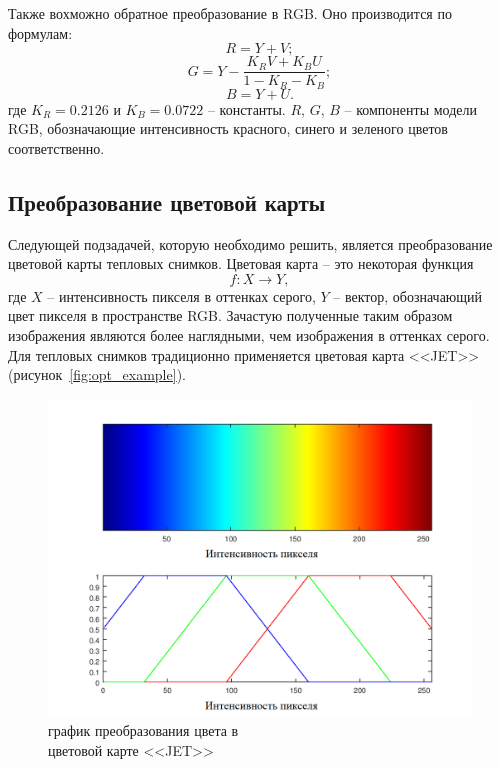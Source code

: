 \documentclass[14pt, a4paper]{extreport}
\begin{document}
	Также вохможно обратное преобразование в RGB. Оно производится по формулам:
	\begin{equation}
		R = Y + V;
		\label{eq:R_in_YUV}
	\end{equation}
	\begin{equation}
		G = Y - \frac{K_R V + K_B U}{1 - K_R - K_B};
		\label{eq:G_in_YUV}
	\end{equation}
	\begin{equation}
	B = Y + U.
		\label{eq:B_in_YUV}
	\end{equation}
	где $K_R = 0.2126$ и $K_B = 0.0722$ -- константы. $R$, $G$, $B$ -- компоненты модели RGB, обозначающие интенсивность красного, синего и зеленого цветов соответственно.

\subsection{Преобразование цветовой карты}
	
	Следующей подзадачей, которую необходимо решить, является преобразование цветовой карты тепловых снимков. Цветовая карта -- это некоторая функция
	\begin{equation}
		f: X \rightarrow Y,
		\label{eq:fXY}
	\end{equation}
	 где $X$ -- интенсивность пикселя в оттенках серого, $Y$ -- вектор, обозначающий цвет пикселя в пространстве RGB. Зачастую полученные таким образом изображения являются более наглядными, чем изображения в оттенках серого. Для тепловых снимков традиционно применяется цветовая карта <<JET>> (рисунок~\ref{fig:opt_example}). 
	
	\begin{figure}[ht!]
		\centering
		\includegraphics[width = 13cm]{image/chapter_2/jet}	
		\caption{график преобразования цвета в\\цветовой карте <<JET>>}
		\label{fig:jet}
	\end{figure}
	
\end{document}
